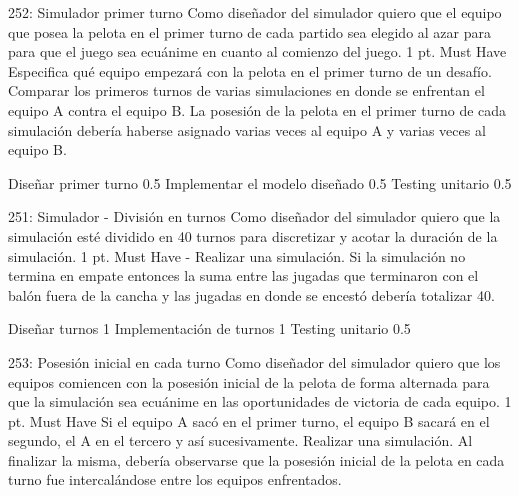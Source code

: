 \sprintstory
{252: Simulador primer turno}
{Como diseñador del simulador quiero que el equipo que posea la pelota en el primer turno de cada partido sea elegido al azar para para que el juego sea ecuánime en cuanto al comienzo del juego.}
{1 pt.}
{Must Have}
{Especifica qué equipo empezará con la pelota en el primer turno de un desafío.}
{Comparar los primeros turnos de varias simulaciones en donde se enfrentan el equipo A contra el equipo B. La posesión de la pelota en el primer turno de cada simulación debería haberse asignado varias veces al equipo A y varias veces al equipo B.}

\begin{taskstable}
 \task
 {Diseñar primer turno}
 {0.5}
 \task
 {Implementar el modelo diseñado}
 {0.5}
 \task
 {Testing unitario}
 {0.5}
\end{taskstable}

\vspace{1cm}


\sprintstory
{251: Simulador - División en turnos}
{Como diseñador del simulador quiero que la simulación esté dividido en 40 turnos para discretizar y acotar la duración de la simulación.}
{1 pt.}
{Must Have}
{-}
{Realizar una simulación. Si la simulación no termina en empate entonces la suma entre las jugadas que terminaron con el balón fuera de la cancha y las jugadas en donde se encestó debería totalizar 40.}

\begin{taskstable}
 \task
 {Diseñar turnos}
 {1}
 \task
 {Implementación de turnos}
 {1}
 \task
 {Testing unitario}
 {0.5}
\end{taskstable}

\vspace{1cm}


\sprintstory
{253: Posesión inicial en cada turno}
{Como diseñador del simulador quiero que los equipos comiencen con la posesión inicial de la pelota de forma alternada para que la simulación sea ecuánime en las oportunidades de victoria de cada equipo.}
{1 pt.}
{Must Have}
{Si el equipo A sacó en el primer turno, el equipo B sacará en el segundo, el A en el tercero y así sucesivamente.}
{Realizar una simulación. Al finalizar la misma, debería observarse que la posesión inicial de la pelota en cada turno fue intercalándose entre los equipos enfrentados.}

